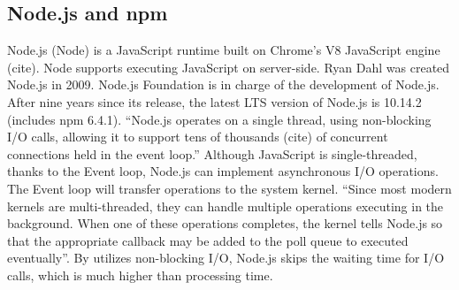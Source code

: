 \subsection{Node.js and npm}
Node.js (Node) is a JavaScript runtime built on Chrome's V8 JavaScript engine (cite). Node supports executing JavaScript on server-side. Ryan Dahl was created Node.js in 2009. Node.js Foundation is in charge of the development of Node.js. After nine years since its release, the latest LTS version of Node.js is 10.14.2 (includes npm 6.4.1). “Node.js operates on a single thread, using non-blocking I/O calls, allowing it to support tens of thousands (cite) of concurrent connections held in the event loop.” Although JavaScript is single-threaded, thanks to the Event loop, Node.js can implement asynchronous I/O operations. The Event loop will transfer operations to the system kernel. “Since most modern kernels are multi-threaded, they can handle multiple operations executing in the background. When one of these operations completes, the kernel tells Node.js so that the appropriate callback may be added to the poll queue to executed eventually”. By utilizes non-blocking I/O, Node.js skips the waiting time for I/O calls, which is much higher than processing time.